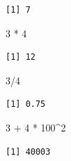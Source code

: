 \documentclass[
  letterpaper,
  DIV=11,
  numbers=noendperiod]{scrreprt}
\newenvironment{Shaded}{\begin{snugshade}}{\end{snugshade}}
\newcommand{\DecValTok}[1]{\textcolor[rgb]{0.68,0.00,0.00}{#1}}
\newcommand{\SpecialCharTok}[1]{\textcolor[rgb]{0.37,0.37,0.37}{#1}}
\begin{document}
\begin{verbatim}
[1] 7
\end{verbatim}

\begin{Shaded}
\begin{Highlighting}[]
\DecValTok{3} \SpecialCharTok{*} \DecValTok{4}
\end{Highlighting}
\end{Shaded}

\begin{verbatim}
[1] 12
\end{verbatim}

\begin{Shaded}
\begin{Highlighting}[]
\DecValTok{3}\SpecialCharTok{/}\DecValTok{4}
\end{Highlighting}
\end{Shaded}

\begin{verbatim}
[1] 0.75
\end{verbatim}

\begin{Shaded}
\begin{Highlighting}[]
\DecValTok{3} \SpecialCharTok{+} \DecValTok{4} \SpecialCharTok{*} \DecValTok{100}\SpecialCharTok{\^{}}\DecValTok{2}
\end{Highlighting}
\end{Shaded}

\begin{verbatim}
[1] 40003
\end{verbatim}
\end{document}
